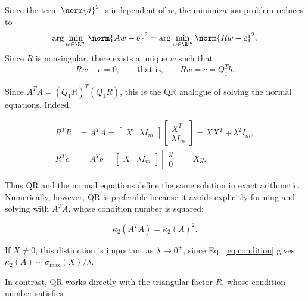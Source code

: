 \noindent Since the term $\norm{d}^2$ is independent of $w$, the minimization problem reduces to
\begin{equation}
\label{eq:qr_triangular_solve}
    \arg\min_{w\in\R^m} \norm{Aw-b}^2
    =
    \arg\min_{w\in\R^m} \norm{Rw-c}^2.
\end{equation}
\noindent Since $R$ is nonsingular, there exists a unique $w$ such that
\begin{equation}
    Rw-c=0,
    \qquad\text{that is,}\qquad
    Rw=c=Q_1^T b.
\end{equation}

\noindent Since $A^T A = (Q_1R)^{T}(Q_1R)$, this is the QR analogue of solving the normal equations. Indeed,

\begin{equation}
\label{eq:qr_normal_equivalence}
\begin{aligned}
    R^T R &= A^T A
    = \begin{bmatrix}
        X & \lambda I_m
    \end{bmatrix}
    \begin{bmatrix}
        X^T \\
        \lambda I_m
    \end{bmatrix}
    = XX^T + \lambda^2 I_m, \\
    R^T c &= A^T b
    = \begin{bmatrix}
        X & \lambda I_m
    \end{bmatrix}
    \begin{bmatrix}
        y \\
        0
    \end{bmatrix}
    = Xy.
\end{aligned}
\end{equation}


\noindent Thus QR and the normal equations define the same solution in exact arithmetic. Numerically, however, 
QR is preferable because it avoids explicitly forming and solving with $A^T A$, whose 
condition number is squared:

\begin{equation}
\label{eq:qr_condition_squaring}
    \kappa_2(A^T A) = \kappa_2(A)^{2}.
\end{equation}

\noindent If $X\neq0$, this distinction is important as $\lambda\to0^+$, since
Eq.~\eqref{eq:condition} gives
$\kappa_2(A)\sim\sigma_{\max}(X)/\lambda$.

\noindent In contrast, QR works directly with the triangular factor $R$, whose condition number satisfies

